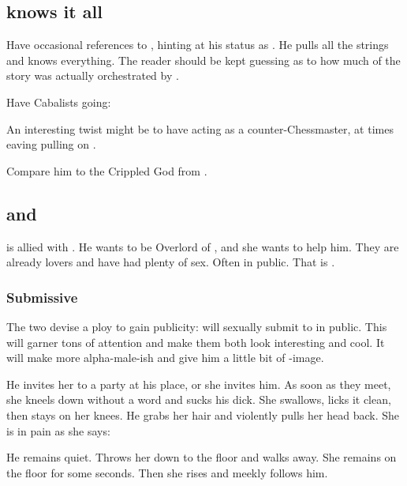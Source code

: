 \begin{garbage}
\subsection{\Daggerrain{} knows it all}
Have occasional references to \hs{\Daggerrain}, hinting at his status as . He pulls all the strings and knows everything. The reader should be kept guessing as to how much of the story was actually orchestrated by \Daggerrain. 

Have Cabalists going: 

An interesting twist might be to have \Secherdamon{} acting as a counter-Chessmaster, at times eaving pulling  on \Daggerrain.

Compare him to the Crippled God from \cite{StevenEriksonIanCameronEsslemont:MalazanBookoftheFallen}. 









\subsection{\Cishiel{} and \Dasteron}
\hs{\Cishiel} is allied with \hs{\Dasteron}. 
He wants to be Overlord of \Mystraacht, and she wants to help him. 
They are already lovers and have had plenty of sex. 
Often in public. 
That is . 





\subsubsection{Submissive \Cishiel}
The two devise a ploy to gain publicity: 
\Cishiel{} will sexually submit to \Dasteron{} in public. 
This will garner tons of attention and make them both look interesting and cool. 
It will make \Dasteron{} more alpha-male-ish and give him a little bit of \Zachirah-image. 

He invites her to a party at his place, or she invites him. 
As soon as they meet, she kneels down without a word and sucks his dick. 
She swallows, licks it clean, then stays on her knees. 
He grabs her hair and violently pulls her head back. 
She is in pain as she says: 

He remains quiet. 
Throws her down to the floor and walks away. 
She remains on the floor for some seconds. 
Then she rises and meekly follows him. 


\end{garbage}
